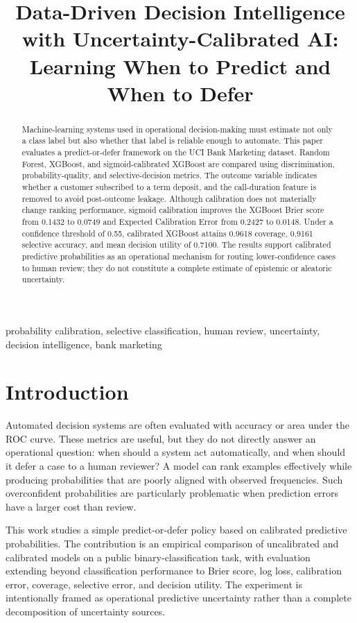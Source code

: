 \documentclass[conference]{IEEEtran}
\title{Data-Driven Decision Intelligence with Uncertainty-Calibrated AI:\\ Learning When to Predict and When to Defer}
\author{\IEEEauthorblockN{Sachi N.}
\IEEEauthorblockA{Independent Research Project\\
Email: saching1302@example.com}}
\begin{document}
\maketitle

\begin{abstract}
Machine-learning systems used in operational decision-making must estimate not only a class label but also whether that label is reliable enough to automate. This paper evaluates a predict-or-defer framework on the UCI Bank Marketing dataset. Random Forest, XGBoost, and sigmoid-calibrated XGBoost are compared using discrimination, probability-quality, and selective-decision metrics. The outcome variable indicates whether a customer subscribed to a term deposit, and the call-duration feature is removed to avoid post-outcome leakage. Although calibration does not materially change ranking performance, sigmoid calibration improves the XGBoost Brier score from 0.1432 to 0.0749 and Expected Calibration Error from 0.2427 to 0.0148. Under a confidence threshold of 0.55, calibrated XGBoost attains 0.9618 coverage, 0.9161 selective accuracy, and mean decision utility of 0.7100. The results support calibrated predictive probabilities as an operational mechanism for routing lower-confidence cases to human review; they do not constitute a complete estimate of epistemic or aleatoric uncertainty.
\end{abstract}

\begin{IEEEkeywords}
probability calibration, selective classification, human review, uncertainty, decision intelligence, bank marketing
\end{IEEEkeywords}

\section{Introduction}
Automated decision systems are often evaluated with accuracy or area under the ROC curve. These metrics are useful, but they do not directly answer an operational question: when should a system act automatically, and when should it defer a case to a human reviewer? A model can rank examples effectively while producing probabilities that are poorly aligned with observed frequencies. Such overconfident probabilities are particularly problematic when prediction errors have a larger cost than review.

This work studies a simple predict-or-defer policy based on calibrated predictive probabilities. The contribution is an empirical comparison of uncalibrated and calibrated models on a public binary-classification task, with evaluation extending beyond classification performance to Brier score, log loss, calibration error, coverage, selective error, and decision utility. The experiment is intentionally framed as operational predictive uncertainty rather than a complete decomposition of uncertainty sources.
\end{document}
